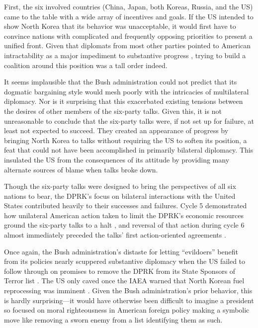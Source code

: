 First, the six involved countries (China, Japan, both Koreas, Russia, and the US) came to the table with a wide array of incentives and goals. If the US intended to show North Korea that its behavior was unacceptable, it would first have to convince nations with complicated and frequently opposing priorities to present a unified front. Given that diplomats from most other parties pointed to American intractability as a major impediment to substantive progress \cite{park6pt}, trying to build a coalition around this position was a tall order indeed.

It seems implausible that the Bush administration could not predict that its dogmatic bargaining style would mesh poorly with the intricacies of multilateral diplomacy. Nor is it surprising that this exacerbated existing tensions between the desires of other members of the six-party talks. Given this, it is not unreasonable to conclude that the six-party talks were, if not set up for failure, at least not expected to succeed. They created an appearance of progress by bringing North Korea to talks without requiring the US to soften its position, a feat that could not have been accomplished in primarily bilateral diplomacy. This insulated the US from the consequences of its attitude by providing many alternate sources of blame when talks broke down.

Though the six-party talks were designed to bring the perspectives of all six nations to bear, the DPRK's focus on bilateral interactions with the United States \cite{rich14,park6pt} contributed heavily to their successes and failures. Cycle 5 demonstrated how unilateral American action taken to limit the DPRK's economic resources ground the six-party talks to a halt \cite{greenlees}, and reversal of that action during cycle 6 almost immediately preceded the talks' first action-oriented agreements \cite{js5,js6}. 

Once again, the Bush administration's distaste for letting ``evildoers'' benefit from its policies nearly scuppered substantive diplomacy when the US failed to follow through on promises to remove the DPRK from its State Sponsors of Terror list \cite{nti15}. The US only caved once the IAEA warned that North Korean fuel reprocessing was imminent \cite{iaea09}. Given the Bush administration's prior behavior, this is hardly surprising---it would have otherwise been difficult to imagine a president so focused on moral righteousness in American foreign policy making a symbolic move like removing a sworn enemy from a list identifying them as such.

